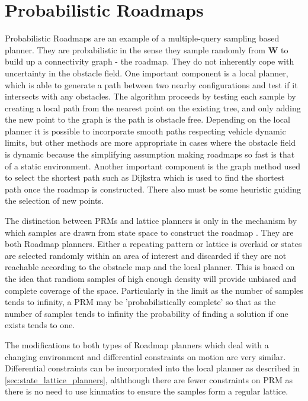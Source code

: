 \documentclass[11pt]{article} %
\begin{document}
\section{Probabilistic Roadmaps}
Probabilistic Roadmaps are an example of a multiple-query sampling based planner. They are probabilistic in the sense they sample randomly from $\mathbf{W}$ to build up a connectivity graph - the roadmap. They do not inherently cope with uncertainty in the obstacle field.
One important component is a local planner, which is able to generate a path between two nearby configurations and test if it intersects with any obstacles. The algorithm proceeds by testing each sample by creating a local path from the nearest point on the existing tree, and only adding the new point to the graph is the path is obstacle free. Depending on the local planner it is possible to incorporate smooth paths respecting vehicle dynamic limits, but other methods are more appropriate in cases where the obstacle field is dynamic because the simplifying assumption making roadmaps so fast is that of a static environment. 
Another important component is the graph method used to select the shortest path such as Dijkstra which is used to find the shortest path once the roadmap is constructed. There also must be some heuristic guiding the selection of new points.

The distinction between PRMs and lattice planners is only in the mechanism by which samples are drawn from state space to construct the roadmap \cite{SicilianoKhatib2016}. They are both Roadmap planners. Either a repeating pattern or lattice is overlaid or states are selected randomly within an area of interest and discarded if they are not reachable according to the obstacle map and the local planner. This is based on the idea that randiom samples of high enough density will provide unbiased and complete coverage of the space. Particularly in the limit as the number of samples tends to infinity, a PRM may be 'probabilistically complete' so that as the number of samples tends to infinity the probability of finding a solution if one exists tends to one.

The modifications to both types of Roadmap planners which deal with a changing environment and differential constraints on motion are very similar. Differential constraints can be incorporated into the local planner as described in \ref{sec:state_lattice_planners}, alththough there are fewer constraints on PRM as there is no need to use kinmatics to ensure the samples form a regular lattice. 
\end{document}
